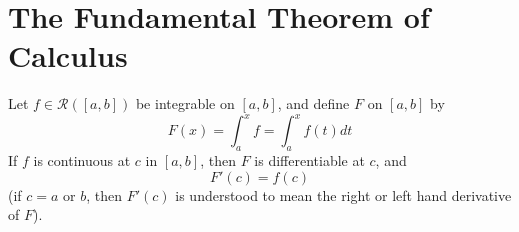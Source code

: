 \section{The Fundamental Theorem of Calculus}

\begin{namthm}\label{thm:FTC1}
    Let $f \in \mathcal{R}([a,b])$ be integrable on $[a,b]$, and define $F$ on $[a,b]$ by \begin{equation}
        F(x) = \int_a^xf = \int_a^xf(t)dt
    \end{equation}
    If $f$ is continuous at $c$ in $[a,b]$, then $F$ is differentiable at $c$, and \begin{equation}
        F'(c) = f(c)
    \end{equation}
    (if $c = a$ or $b$, then $F'(c)$ is understood to mean the right or left hand derivative of $F$).
\end{namthm}
